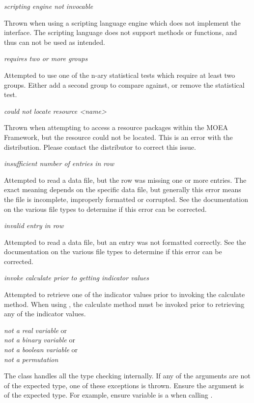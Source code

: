 \noindent
\textit{scripting engine not invocable}
\begin{indented}
  Thrown when using a scripting language engine which does not implement the  interface.  The scripting language does not support methods or functions, and thus can not be used as intended.
\end{indented}
  
\noindent
\textit{requires two or more groups}
\begin{indented}
  Attempted to use one of the n-ary statistical tests which require at least two groups.  Either add a second group to compare against, or remove the statistical test.
\end{indented}
  
\noindent
\textit{could not locate resource <name>}
\begin{indented}
  Thrown when attempting to access a resource packages within the MOEA Framework, but the resource could not be located.  This is an error with the distribution.  Please contact the distributor to correct this issue.
\end{indented}
  
\noindent
\textit{insufficient number of entries in row}
\begin{indented}
  Attempted to read a data file, but the row was missing one or more entries. The exact meaning depends on the specific data file, but generally this error means the file is incomplete, improperly formatted or corrupted.  See the documentation on the various file types to determine if this error can be corrected.
\end{indented}
  
\noindent
\textit{invalid entry in row}
\begin{indented}
  Attempted to read a data file, but an entry was not formatted correctly. See the documentation on the various file types to determine if this error can be corrected.
\end{indented}

\noindent
\textit{invoke calculate prior to getting indicator values}
\begin{indented}
  Attempted to retrieve one of the indicator values prior to invoking the calculate method.  When using , the calculate method must be invoked prior to retrieving any of the indicator values.
\end{indented}

\noindent
\textit{not a real variable} or\\
\textit{not a binary variable} or\\
\textit{not a boolean variable} or\\
\textit{not a permutation}
\begin{indented}
  The  class handles all the type checking internally.  If any of the arguments are not of the expected type, one of these exceptions is thrown.  Ensure the argument is of the expected type.  For example, ensure variable is a  when calling .
\end{indented}


